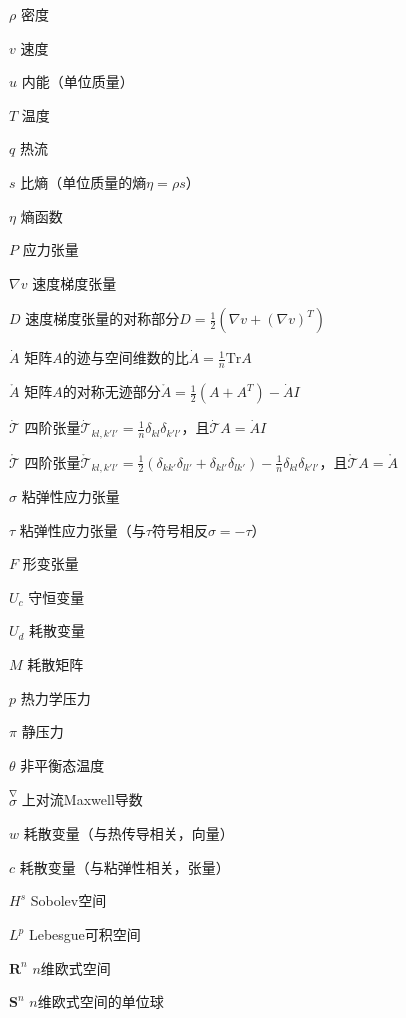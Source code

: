 \begin{denotation}[3cm]

\item[$\rho$] 密度
\item[$v$] 速度
\item[$u$] 内能（单位质量）
\item[$T$] 温度
\item[$q$] 热流
\item[$s$] 比熵（单位质量的熵$\eta = \rho s$）
\item[$\eta$] 熵函数
\item[$P$] 应力张量
\item[$\nabla v$] 速度梯度张量
\item[$D$] 速度梯度张量的对称部分$D = \frac{1}{2}(\nabla v + (\nabla v)^T)$
\item[$\dot{A}$] 矩阵$A$的迹与空间维数的比$\dot{A} = \frac{1}{n} \mbox{Tr} A$
\item[$\mathring{A}$] 矩阵$A$的对称无迹部分$\mathring{A} = \frac{1}{2}(A+A^T) - \dot{A}I$
\item[$\dot{\mathcal{T}}$] 四阶张量$\dot{\mathcal{T}}_{kl,k'l'} = \frac{1}{n}\delta_{kl} \delta_{k'l'}$，且$\dot{\mathcal{T}} A = \dot{A} I$
\item[$\mathring{\mathcal{T}}$] 四阶张量$\mathring{\mathcal{T}}_{kl,k'l'} =\frac{1}{2}(\delta_{kk'}\delta_{ll'} + \delta_{kl'} \delta_{lk'} ) -\frac{1}{n}\delta_{kl} \delta_{k'l'} $，且$\mathring{\mathcal{T}} A = \mathring{A}$
\item[$\sigma$] 粘弹性应力张量
\item[$\tau$] 粘弹性应力张量（与$\tau$符号相反$\sigma=-\tau$）
\item[$F$] 形变张量
\item[$U_c$] 守恒变量
\item[$U_d$] 耗散变量
\item[$M$] 耗散矩阵
\item[$p$] 热力学压力
\item[$\pi$] 静压力
\item[$\theta$] 非平衡态温度
\item[$\stackrel{\nabla} \sigma$] 上对流Maxwell导数
\item[$w$] 耗散变量（与热传导相关，向量）
\item[$c$] 耗散变量（与粘弹性相关，张量）
\item[$H^s$] Sobolev空间
\item[$L^p$] Lebesgue可积空间
\item[$\mathbf{R}^n$] $n$维欧式空间
\item[$\mathbf{S}^n$] $n$维欧式空间的单位球


\end{denotation}
